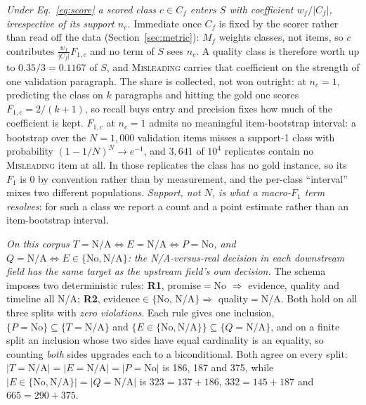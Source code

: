  \emph{Under Eq.~\eqref{eq:score} a scored class $c\in C_f$
enters $S$ with coefficient $w_f/|C_f|$, irrespective of its support $n_c$.} Immediate once $C_f$
is fixed by the scorer rather than read off the data (Section~\ref{sec:metric}): $M_f$ weights
classes, not items, so $c$ contributes $\tfrac{w_f}{|C_f|}F_{1,c}$ and no term of $S$ sees $n_c$.
A quality class is therefore worth up to $0.35/3=0.1167$ of $S$, and
\textsc{Misleading} carries that coefficient on the strength of one validation paragraph. The
share is collected, not won outright: at $n_c{=}1$, predicting the class on $k$ paragraphs and
hitting the gold one scores $F_{1,c}=2/(k{+}1)$, so recall buys entry and precision fixes how much
of the coefficient is kept. $F_{1,c}$ at
$n_c{=}1$ admits no meaningful item-bootstrap interval: a bootstrap over the $N{=}1{,}000$ validation
items misses a support-1 class with probability $(1-1/N)^{N}\to e^{-1}$, and $3{,}641$ of $10^4$
replicates contain no \textsc{Misleading} item at all. In those replicates the class has no gold
instance, so its $F_1$ is $0$ by convention rather than by measurement, and
the per-class ``interval'' mixes two different populations. \emph{Support, not $N$, is what a
macro-$F_1$ term resolves}: for such a class we report a count and a point estimate rather than
an item-bootstrap interval.

 \emph{On this corpus $T{=}\text{N/A}\iff
E{=}\text{N/A}\iff P{=}\text{No}$, and $Q{=}\text{N/A}\iff E\in\{\text{No},\text{N/A}\}$: the
N/A-versus-real decision in each downstream field has the same target as the upstream field's own
decision.} The schema imposes two deterministic rules: \textbf{R1}, promise${=}$No $\Rightarrow$
evidence, quality and timeline all N/A; \textbf{R2}, evidence$\in\{$No, N/A$\}\Rightarrow$
quality${=}$N/A. Both hold on all three splits with \emph{zero violations}. Each rule gives one
inclusion, $\{P{=}\text{No}\}\subseteq\{T{=}\text{N/A}\}$ and
$\{E\in\{\text{No},\text{N/A}\}\}\subseteq\{Q{=}\text{N/A}\}$, and on a finite split an inclusion
whose two sides have equal cardinality is an equality, so counting \emph{both} sides upgrades each
to a biconditional. Both agree on every split:
$|T{=}\text{N/A}|=|E{=}\text{N/A}|=|P{=}\text{No}|$ is 186, 187 and 375, while
$|E\in\{\text{No},\text{N/A}\}|=|Q{=}\text{N/A}|$ is $323{=}137{+}186$, $332{=}145{+}187$ and
$665{=}290{+}375$.

